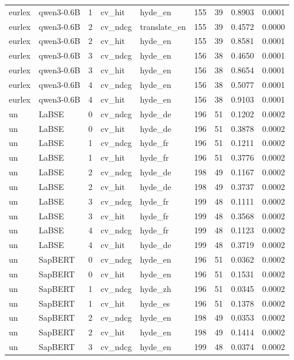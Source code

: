 \begin{tabular}{llrllrrrr}
eurlex & qwen3-0.6B & 1 & cv\_hit & hyde\_en & 155 & 39 & 0.8903 & 0.0001 \\
eurlex & qwen3-0.6B & 2 & cv\_ndcg & translate\_en & 155 & 39 & 0.4572 & 0.0000 \\
eurlex & qwen3-0.6B & 2 & cv\_hit & hyde\_en & 155 & 39 & 0.8581 & 0.0001 \\
eurlex & qwen3-0.6B & 3 & cv\_ndcg & hyde\_en & 156 & 38 & 0.4650 & 0.0001 \\
eurlex & qwen3-0.6B & 3 & cv\_hit & hyde\_en & 156 & 38 & 0.8654 & 0.0001 \\
eurlex & qwen3-0.6B & 4 & cv\_ndcg & hyde\_en & 156 & 38 & 0.5077 & 0.0001 \\
eurlex & qwen3-0.6B & 4 & cv\_hit & hyde\_en & 156 & 38 & 0.9103 & 0.0001 \\
un & LaBSE & 0 & cv\_ndcg & hyde\_de & 196 & 51 & 0.1202 & 0.0002 \\
un & LaBSE & 0 & cv\_hit & hyde\_de & 196 & 51 & 0.3878 & 0.0002 \\
un & LaBSE & 1 & cv\_ndcg & hyde\_fr & 196 & 51 & 0.1211 & 0.0002 \\
un & LaBSE & 1 & cv\_hit & hyde\_fr & 196 & 51 & 0.3776 & 0.0002 \\
un & LaBSE & 2 & cv\_ndcg & hyde\_de & 198 & 49 & 0.1167 & 0.0002 \\
un & LaBSE & 2 & cv\_hit & hyde\_de & 198 & 49 & 0.3737 & 0.0002 \\
un & LaBSE & 3 & cv\_ndcg & hyde\_fr & 199 & 48 & 0.1111 & 0.0002 \\
un & LaBSE & 3 & cv\_hit & hyde\_fr & 199 & 48 & 0.3568 & 0.0002 \\
un & LaBSE & 4 & cv\_ndcg & hyde\_fr & 199 & 48 & 0.1123 & 0.0002 \\
un & LaBSE & 4 & cv\_hit & hyde\_de & 199 & 48 & 0.3719 & 0.0002 \\
un & SapBERT & 0 & cv\_ndcg & hyde\_en & 196 & 51 & 0.0362 & 0.0002 \\
un & SapBERT & 0 & cv\_hit & hyde\_en & 196 & 51 & 0.1531 & 0.0002 \\
un & SapBERT & 1 & cv\_ndcg & hyde\_zh & 196 & 51 & 0.0345 & 0.0002 \\
un & SapBERT & 1 & cv\_hit & hyde\_es & 196 & 51 & 0.1378 & 0.0002 \\
un & SapBERT & 2 & cv\_ndcg & hyde\_en & 198 & 49 & 0.0353 & 0.0002 \\
un & SapBERT & 2 & cv\_hit & hyde\_en & 198 & 49 & 0.1414 & 0.0002 \\
un & SapBERT & 3 & cv\_ndcg & hyde\_en & 199 & 48 & 0.0374 & 0.0002 \\

\end{tabular}
